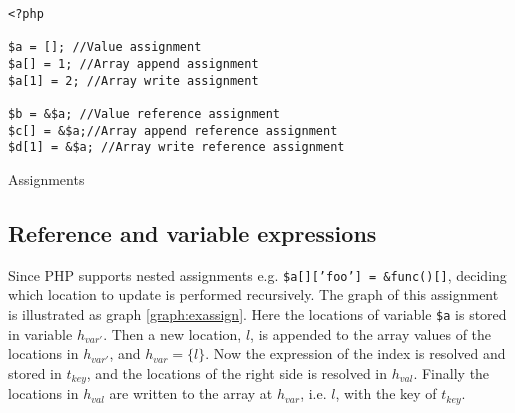 \begin{graph}
{\begin{adjustbox}{max size={.24\textwidth}{.25\textheight}}
\begin{tikzpicture}[node distance = 2cm, auto]
\end{tikzpicture}\end{adjustbox}}\hfill%
\hspace*{\fill}
\end{graph}
\begin{program}
\begin{lstlisting}
<?php

$a = []; //Value assignment
$a[] = 1; //Array append assignment
$a[1] = 2; //Array write assignment

$b = &$a; //Value reference assignment
$c[] = &$a;//Array append reference assignment
$d[1] = &$a; //Array write reference assignment

\end{lstlisting}
\caption{Assignments}
\label{lst:assignments}
\end{program}

\subsection{Reference and variable expressions}
Since PHP supports nested assignments e.g. \texttt{\$a[]['foo']  = \&func()[]}, deciding which location to update is performed recursively. The graph of this assignment is illustrated as graph \ref{graph:exassign}. Here the locations of variable \texttt{\$a} is stored in variable $h_{var'}$. Then a new location, $l$, is appended to the array values of the locations in $h_{var'}$, and $h_{var} = \{l\}$. Now the expression of the index is resolved and stored in $t_{key}$, and the locations of the right side is resolved in $h_{val}$. Finally the locations in $h_{val}$ are written to the array at $h_{var}$, i.e. $l$, with the key of $t_{key}$. 

